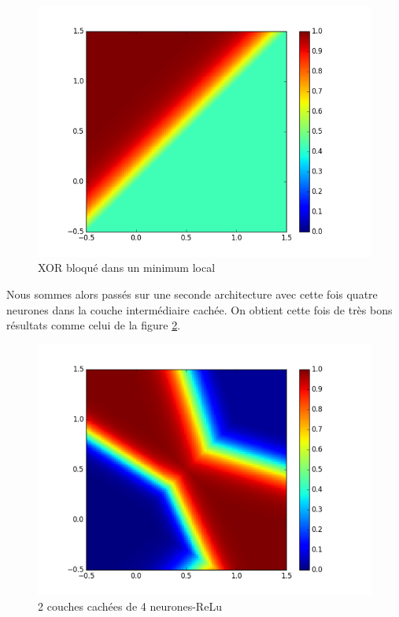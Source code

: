 \documentclass{report}
\begin{document}
\begin{figure}[!h]
\begin{center}
\includegraphics[scale=0.6]{images/xor_non_fonctionnel.png}
\caption{XOR bloqué dans un minimum local}
\label{xor_non_fonctionnel}
\end{center}
\end{figure}

Nous sommes alors passés sur une seconde architecture avec cette fois quatre neurones dans la couche intermédiaire cachée. On obtient cette fois de très bons résultats comme celui de la figure \ref{xor_relu_2_4}.

\begin{figure}[!h]
\begin{center}
\includegraphics[scale=0.6]{images/xor_relu_2_4.png}
\caption{2 couches cachées de 4 neurones-ReLu}
\label{xor_relu_2_4}
\end{center}
\end{figure}
\end{document}
